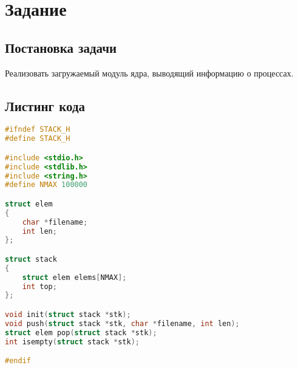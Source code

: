 \newpage
\section*{Задание}
\subsection*{Постановка задачи}
Реализовать загружаемый модуль ядра, выводящий информацию о процессах.


\subsection*{Листинг кода}
\begin{lstlisting}[language=c,caption=Листинг кода заголовочного файла]
#ifndef STACK_H
#define STACK_H

#include <stdio.h>
#include <stdlib.h>
#include <string.h>
#define NMAX 100000

struct elem 
{
	char *filename;
	int len;
};

struct stack 
{
	struct elem elems[NMAX];
	int top;
};

void init(struct stack *stk);
void push(struct stack *stk, char *filename, int len);
struct elem pop(struct stack *stk);
int isempty(struct stack *stk);

#endif
\end{lstlisting}
